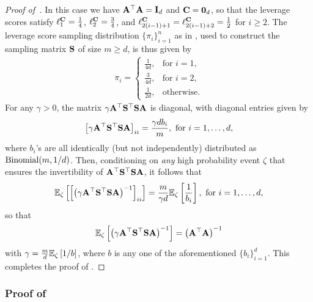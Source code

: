 \documentclass[11pt,a4paper]{article}
\begin{document}
\begin{proof}[Proof of~]
In this case we have $\A^{\top}\A=\I_d$ and $\C=\zo_d$, so that the leverage scores satisfy $\ell_{1}^\C=\frac{1}{4}$, $\ell_{2}^\C=\frac{3}{4}$, and $\ell_{2(i-1)+1}^\C=\ell_{2(i-1)+2}^\C=\frac{1}{2}$ for $i\geq 2$. 
The leverage score sampling distribution $\{\pi_i\}_{i=1}^n$ as in , used to construct the sampling matrix $\S$ of size $m\geq d$, is thus given by
\begin{align*}
\pi_i
= 
    \begin{cases}
\frac{1}{4d}, & \text{for } i = 1, \\
\frac{3}{4d}, & \text{for } i = 2, \\
\frac{1}{2d}, & \text{otherwise}.
\end{cases}
\end{align*}
For any $\gamma>0$, the matrix  $\gamma \A^\top \S^\top \S \A$   is diagonal, with diagonal entries  given by
  \begin{align*}
   \left[ \gamma  \A^\top \S^\top \S \A\right]_{ii}=\frac{\gamma db_i }{m},~\mbox{for}~i=1,\ldots, d,
  \end{align*}
where $b_i$'s are all identically (but not independently) distributed as ${\rm Binomial}(m, 1/d)$. 
Then, conditioning on \emph{any} high probability event $\zeta$ that ensures the invertibility of $  \A^\top \S^\top \S \A$,  it follows that    
\begin{align*}
 \EE_{\zeta}\left[\left[ \left(\gamma  \A^\top \S^\top \S \A\right)^{-1}\right]_{ii}\right] =  \frac{m}{\gamma d} \EE_{\zeta}\left[\frac{1}{b_i}\right],~\mbox{for}~i=1,\ldots, d,
  \end{align*}
so that
\begin{align*}
\EE_{\zeta}\left[ \left(\gamma  \A^\top \S^\top \S \A\right)^{-1}\right]=\left(  \A^\top \A\right)^{-1}    
\end{align*} 
with $ \gamma=  \frac{m}{d}\EE_{\zeta}\left[1/b\right] $, where  $b$ is any one of the aforementioned $\{b_i\}^d_{i=1}$. 
This completes the proof of .
\end{proof}


\subsubsection{Proof of~}
\label{rem:proof of SRHT}
\end{document}

